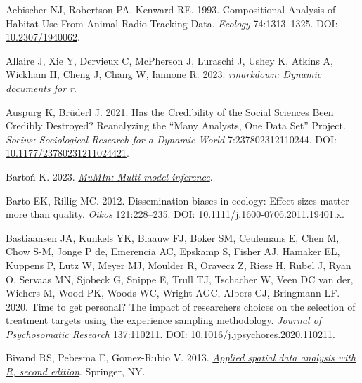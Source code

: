 \documentclass[10pt,a4paper]{article}
\newlength{\cslhangindent}
\newenvironment{CSLReferences}[2] %
 {\begin{list}{}{%
  \setlength{\itemindent}{0pt}
  \setlength{\leftmargin}{0pt}
  \setlength{\parsep}{0pt}
  \ifodd #1
   \setlength{\leftmargin}{\cslhangindent}
   \setlength{\itemindent}{-1\cslhangindent}
  \fi
  \setlength{\itemsep}{#2\baselineskip}}}
 {\end{list}}
\begin{document}
\label{refs}
\begin{CSLReferences}{1}{0}
Aebischer NJ, Robertson PA, Kenward RE. 1993. Compositional {Analysis} of {Habitat} {Use} {From} {Animal} {Radio}‐{Tracking} {Data}. \emph{Ecology} 74:1313--1325. DOI: \href{https://doi.org/10.2307/1940062}{10.2307/1940062}.

Allaire J, Xie Y, Dervieux C, McPherson J, Luraschi J, Ushey K, Atkins A, Wickham H, Cheng J, Chang W, Iannone R. 2023. \emph{\href{https://github.com/rstudio/rmarkdown}{{rmarkdown}: Dynamic documents for r}}.

Auspurg K, Brüderl J. 2021. Has the {Credibility} of the {Social} {Sciences} {Been} {Credibly} {Destroyed}? {Reanalyzing} the {``{Many} {Analysts}, {One} {Data} {Set}''} {Project}. \emph{Socius: Sociological Research for a Dynamic World} 7:237802312110244. DOI: \href{https://doi.org/10.1177/23780231211024421}{10.1177/23780231211024421}.

Bartoń K. 2023. \emph{\href{https://CRAN.R-project.org/package=MuMIn}{MuMIn: Multi-model inference}}.

Barto EK, Rillig MC. 2012. Dissemination biases in ecology: Effect sizes matter more than quality. \emph{Oikos} 121:228--235. DOI: \href{https://doi.org/10.1111/j.1600-0706.2011.19401.x}{10.1111/j.1600-0706.2011.19401.x}.

Bastiaansen JA, Kunkels YK, Blaauw FJ, Boker SM, Ceulemans E, Chen M, Chow S-M, Jonge P de, Emerencia AC, Epskamp S, Fisher AJ, Hamaker EL, Kuppens P, Lutz W, Meyer MJ, Moulder R, Oravecz Z, Riese H, Rubel J, Ryan O, Servaas MN, Sjobeck G, Snippe E, Trull TJ, Tschacher W, Veen DC van der, Wichers M, Wood PK, Woods WC, Wright AGC, Albers CJ, Bringmann LF. 2020. Time to get personal? {The} impact of researchers choices on the selection of treatment targets using the experience sampling methodology. \emph{Journal of Psychosomatic Research} 137:110211. DOI: \href{https://doi.org/10.1016/j.jpsychores.2020.110211}{10.1016/j.jpsychores.2020.110211}.

Bivand RS, Pebesma E, Gomez-Rubio V. 2013. \emph{\href{https://asdar-book.org/}{Applied spatial data analysis with {R}, second edition}}. Springer, NY.


\end{CSLReferences}
\end{document}
